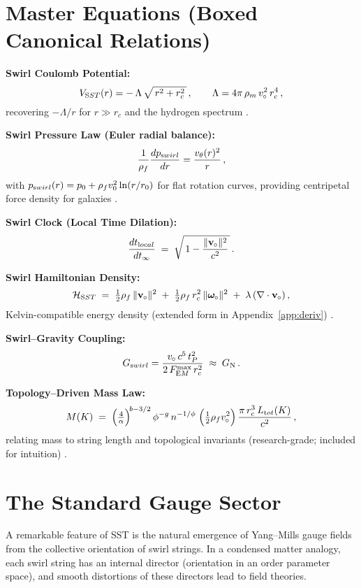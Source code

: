 \documentclass[11pt]{article}
\begin{document}
	\section{Master Equations (Boxed Canonical Relations)}
	\textbf{Swirl Coulomb Potential:}
	\[
		V_{\textrm SST}(r) = -\,\Lambda\,\sqrt{\,r^2 + r_c^2\,}\,, \qquad \Lambda = 4\pi\,\rho_m\,v_{\!\!\;\circ}^2\,r_c^4\,,
	\]
	recovering $-\Lambda/r$ for $r\gg r_c$ and the hydrogen spectrum \cite{Iskandarani2025Canon034,Iskandarani2025Hydrogen}.

	\textbf{Swirl Pressure Law (Euler radial balance):}
	\[
		\frac{1}{\rho_f}\frac{dp_{\textrm swirl}}{dr} = \frac{v_\theta(r)^2}{\,r\,}\,,
	\]
	with $p_{\textrm swirl}(r) = p_0 + \rho_f v_0^2 \ln(r/r_0)$ for flat rotation curves, providing centripetal force density for galaxies \cite{Batchelor1967,Saffman1992,Iskandarani2025Canon034}.

	\textbf{Swirl Clock (Local Time Dilation):}
	\[
		\frac{dt_{\textrm local}}{dt_{\infty}} \;=\; \sqrt{\,1 - \frac{\|\mathbf{v}_{\!\!\;\circ}\|^2}{c^2}\,}\,.
	\]

	\textbf{Swirl Hamiltonian Density:}
	\[
		\mathcal{H}_{\textrm SST} \;=\; \tfrac{1}{2}\rho_f\,\|\mathbf{v}_{\!\!\;\circ}\|^2 \;+\; \tfrac{1}{2}\rho_f\,r_c^2\,\|\boldsymbol{\omega}_{\!\!\;\circ}\|^2 \;+\; \lambda\,(\nabla\cdot\mathbf{v}_{\!\!\;\circ})\,,
	\]
	Kelvin-compatible energy density (extended form in Appendix~\ref{app:deriv}) \cite{Batchelor1967,Saffman1992}.

	\textbf{Swirl--Gravity Coupling:}
	\[
		G_{\textrm swirl} = \frac{v_{\!\!\;\circ}\,c^5\,t_P^2}{2\,F_{\textrm EM}^{\max}\,r_c^2} \;\approx\; G_{\textrm N}\,.
	\]

	\textbf{Topology--Driven Mass Law:}
	\[
		M(K)\;=\;\Big(\tfrac{4}{\alpha}\Big)^{\!b-3/2}\,\phi^{-g}\,n^{-1/\phi}\;\Big(\tfrac{1}{2}\rho_f v_{\!\!\;\circ}^2\Big)\,\frac{\pi\,r_c^3\,L_{\textrm tot}(K)}{c^2}\,,
	\]
	relating mass to string length and topological invariants (research-grade; included for intuition) \cite{Iskandarani2025Canon034}.

	\section{The Standard Gauge Sector}
	A remarkable feature of SST is the natural emergence of Yang--Mills gauge fields from the collective orientation of swirl strings. In a condensed matter analogy, each swirl string has an internal director (orientation in an order parameter space), and smooth distortions of these directors lead to field theories.
\end{document}
